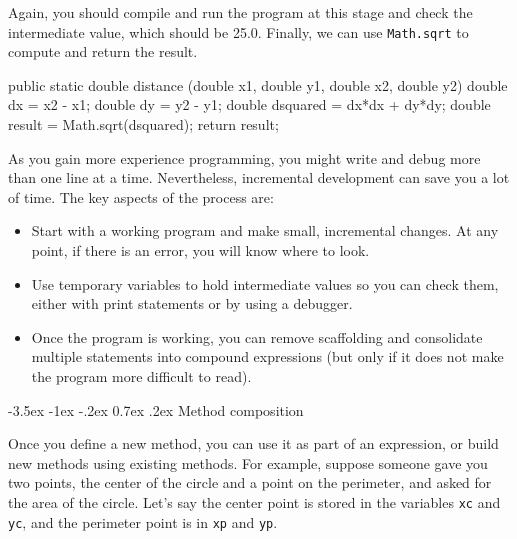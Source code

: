 \documentclass[12pt]{book}
\makeatletter
\theoremstyle{exercise}
\newcommand{\java}[1]{\verb"#1"}
\renewcommand{\section}{\@startsection{section}{1}{\z@}%
    {-3.5ex \@plus -1ex \@minus -.2ex}%
    {0.7ex \@plus.2ex}%
    {\normalfont\Large\bfseries}}
\newcommand{\java}[1]{\lstinline{#1}} %
\makeatother
\begin{document}
Again, you should compile and run the program at this stage and check the intermediate value, which should be 25.0.
Finally, we can use \java{Math.sqrt} to compute and return the result.

\begin{code}
    public static double distance
            (double x1, double y1, double x2, double y2) {
        double dx = x2 - x1;
        double dy = y2 - y1;
        double dsquared = dx*dx + dy*dy;
        double result = Math.sqrt(dsquared);
        return result;
    }
\end{code}


As you gain more experience programming, you might write and debug more than one line at a time.
Nevertheless, incremental development can save you a lot of time.
The key aspects of the process are:

\begin{itemize}

\item Start with a working program and make small, incremental changes.
At any point, if there is an error, you will know where to look.

\item Use temporary variables to hold intermediate values so you can check them, either with print statements or by using a debugger.

\item Once the program is working, you can remove scaffolding and consolidate multiple statements into compound expressions (but only if it does not make the program more difficult to read).

\end{itemize}


\section{Method composition}


Once you define a new method, you can use it as part of an expression, or build new methods using existing methods.
For example, suppose someone gave you two points, the center of the circle and a point on the perimeter, and asked for the area of the circle.
Let's say the center point is stored in the variables \java{xc} and \java{yc}, and the perimeter point is in \java{xp} and \java{yp}.
\end{document}
